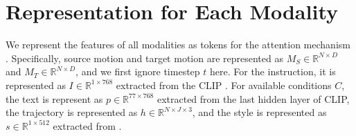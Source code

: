 \begin{table*}[!h]
\caption{Ablation studies of our MotionLab's task combinations.}
\label{tab:ablation_task}
\end{table*}

\section{Representation for Each Modality}
We represent the features of all modalities as tokens for the attention mechanism \cite{vaswani2017attention}. Specifically, source motion and target motion are represented as $M_S \in \mathbb{R}^{N\times D}$ and $M_T \in \mathbb{R}^{N\times D}$, and we first ignore timestep $t$ here. For the instruction, it is represented as $I\in\mathbb{R}^{1\times768}$ extracted from the CLIP \cite{radford2021learning}. For available conditions $C$, the text is represent as $p\in\mathbb{R}^{77\times768}$ extracted from the last hidden layer of CLIP, the trajectory is represented as $h\in \mathbb{R}^{N\times J\times3}$, and the style is represented as $s\in\mathbb{R}^{1\times512}$ extracted from \citeauthor{zhong2025smoodi}. 

